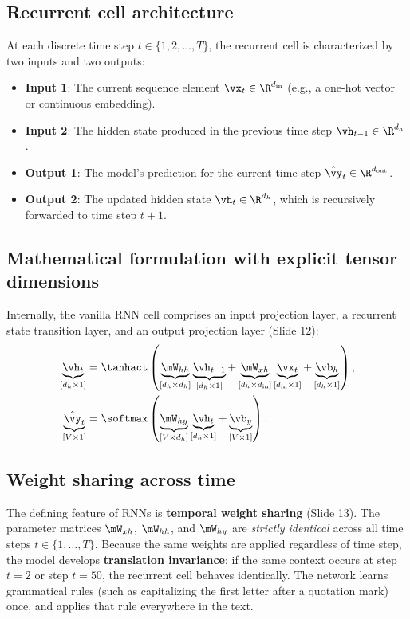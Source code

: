 \documentclass[../../main.tex]{subfiles}
\begin{document}
\subsection{Recurrent cell architecture}
At each discrete time step $t \in \{1, 2, \dots, T\}$, the recurrent cell is characterized by two inputs and two outputs:
\begin{itemize}
    \item \textbf{Input 1}: The current sequence element $\vx_t \in \R^{d_{\text{in}}}$ (e.g., a one-hot vector or continuous embedding).
    \item \textbf{Input 2}: The hidden state produced in the previous time step $\vh_{t-1} \in \R^{d_h}$.
    \item \textbf{Output 1}: The model's prediction for the current time step $\hat{\vy}_t \in \R^{d_{\text{out}}}$.
    \item \textbf{Output 2}: The updated hidden state $\vh_t \in \R^{d_h}$, which is recursively forwarded to time step $t+1$.
\end{itemize}

\subsection{Mathematical formulation with explicit tensor dimensions}
Internally, the vanilla RNN cell comprises an input projection layer, a recurrent state transition layer, and an output projection layer (Slide 12):
\begin{align}
\underbrace{\vh_t}_{[d_h \times 1]} &= \tanhact\left( \underbrace{\mW_{hh}}_{[d_h \times d_h]} \underbrace{\vh_{t-1}}_{[d_h \times 1]} + \underbrace{\mW_{xh}}_{[d_h \times d_{\text{in}}]} \underbrace{\vx_t}_{[d_{\text{in}} \times 1]} + \underbrace{\vb_h}_{[d_h \times 1]} \right), \label{eq:rnn_hidden_step} \\
\underbrace{\hat{\vy}_t}_{[V \times 1]} &= \softmax\left( \underbrace{\mW_{hy}}_{[V \times d_h]} \underbrace{\vh_t}_{[d_h \times 1]} + \underbrace{\vb_y}_{[V \times 1]} \right). \label{eq:rnn_output_step}
\end{align}

\subsection{Weight sharing across time}
The defining feature of RNNs is \textbf{temporal weight sharing} (Slide 13). The parameter matrices $\mW_{xh}$, $\mW_{hh}$, and $\mW_{hy}$ are \emph{strictly identical} across all time steps $t \in \{1, \dots, T\}$. 
Because the same weights are applied regardless of time step, the model develops \textbf{translation invariance}: if the same context occurs at step $t=2$ or step $t=50$, the recurrent cell behaves identically. The network learns grammatical rules (such as capitalizing the first letter after a quotation mark) once, and applies that rule everywhere in the text.
\end{document}
